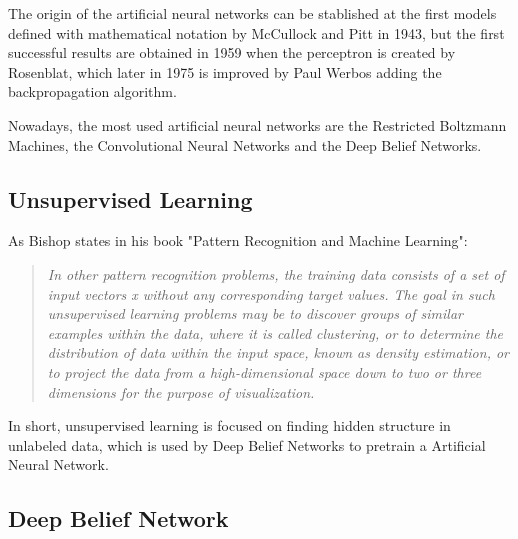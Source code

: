 \documentclass[a4paper,openany,oneside,12pt]{book}
\begin{document}
The origin of the artificial neural networks can be stablished at the first models defined with mathematical notation by McCullock and Pitt in 1943, but the first successful results are obtained in 1959 when the perceptron is created by Rosenblat, which later in 1975 is improved by Paul Werbos adding the backpropagation algorithm.

Nowadays, the most used artificial neural networks are the Restricted Boltzmann Machines, the Convolutional Neural Networks and the Deep Belief Networks.

\subsection{Unsupervised Learning}
As Bishop states in his book "Pattern Recognition and Machine Learning":
\begin{quote}
\em In other pattern recognition problems, the training data consists of a set of input vectors x without any corresponding target values. The goal in such unsupervised learning problems may be to discover groups of similar examples within the data, where it is called clustering, or to determine the distribution of data within the input space, known as density estimation, or to project the data from a high-dimensional space down to two or three dimensions for the purpose of visualization.
\end{quote}

In short, unsupervised learning is focused on finding hidden structure in unlabeled data, which is used by Deep Belief Networks to pretrain a Artificial Neural Network. \cite{Bishop}

\subsection{Deep Belief Network}
\end{document}
